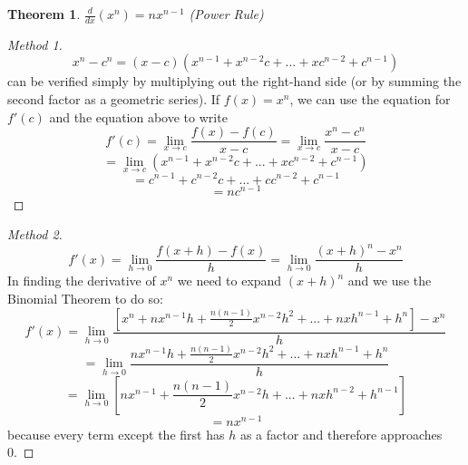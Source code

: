 \documentclass[10pt]{report}
\newtheorem{thm3}{Theorem}[subsection]
\begin{document}
\begin{thm3}
$\frac{d}{dx}(x^{n})=nx^{n-1}$ (Power Rule)
\end{thm3}
\begin{proof}[Method 1]
$$x^{n} - c^{n} = (x-c)(x^{n-1}+x^{n-2}c+...+xc^{n-2}+c^{n-1})$$ can be verified simply by multiplying out the right-hand side (or by summing the second factor as a geometric series). If $f(x) = x^{n}$, we can use the equation for $f'(c)$ and the equation above to write $$f'(c)=\lim_{x\to c}\frac{f(x)-f(c)}{x-c}=\lim_{x\to c}\frac{x^{n}-c^{n}}{x-c}$$
$$=\lim_{x\to c}(x^{n-1}+x^{n-2}c+...+xc^{n-2}+c^{n-1})$$
$$=c^{n-1}+c^{n-2}c+...+cc^{n-2}+c^{n-1}$$
$$=nc^{n-1}$$
\end{proof}
\begin{proof}[Method 2]
$$f'(x)=\lim_{h\to 0}\frac{f(x+h)-f(x)}{h}=\lim_{h\to 0}\frac{(x+h)^{n}-x^{n}}{h}$$
In finding the derivative of $x^{n}$ we need to expand $(x+h)^{n}$ and we use the Binomial Theorem to do so:
$$f'(x)=\lim_{h\to 0}\frac{\left[x^{n}+nx^{n-1}h+\frac{n(n-1)}{2}x^{n-2}h^{2}+...+nxh^{n-1}+h^{n}\right]-x^{n}}{h}$$
$$=\lim_{h\to 0}\frac{nx^{n-1}h+\frac{n(n-1)}{2}x^{n-2}h^{2}+...+nxh^{n-1}+h^{n}}{h}$$
$$=\lim_{h\to 0}[nx^{n-1}+\frac{n(n-1)}{2}x^{n-2}h +...+nxh^{n-2}+h^{n-1}]$$
$$=nx^{n-1}$$
because every term except the first has $h$ as a factor and therefore approaches 0.
\end{proof}
\end{document}
